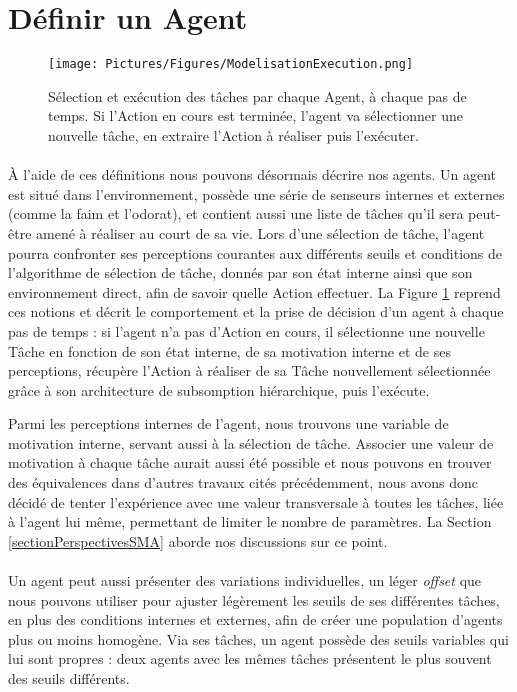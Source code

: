 	
	\section{Définir un Agent}
	
	\begin{figure}
	\centering
	\texttt{[image: Pictures/Figures/ModelisationExecution.png]}
	\caption[Sélection et exécution des tâches par chaque Agent, à chaque pas de temps.]{Sélection et exécution des tâches par chaque Agent, à chaque pas de temps. Si l'Action en cours est terminée, l'agent va sélectionner une nouvelle tâche, en extraire l'Action à réaliser puis l'exécuter.}
	\label{agentExec}
	\end{figure}		
	
		\paragraph{}
		À l'aide de ces définitions nous pouvons désormais décrire nos agents. Un agent est situé dans l'environnement, possède une série de senseurs internes et externes (comme la faim et l'odorat), et contient aussi une liste de tâches qu'il sera peut-être amené à réaliser au court de sa vie. Lors d'une sélection de tâche, l'agent pourra confronter ses perceptions courantes aux différents seuils et conditions de l'algorithme de sélection de tâche, donnés par son état interne ainsi que son environnement direct, afin de savoir quelle Action effectuer. La Figure \ref{agentExec} reprend ces notions et décrit le comportement et la prise de décision d'un agent à chaque pas de temps : si l'agent n'a pas d'Action en cours, il sélectionne une nouvelle Tâche en fonction de son état interne, de sa motivation interne et de ses perceptions, récupère l'Action à réaliser de sa Tâche nouvellement sélectionnée grâce à son architecture de subsomption hiérarchique, puis l'exécute.
		
		Parmi les perceptions internes de l'agent, nous trouvons une variable de motivation interne, servant aussi à la sélection de tâche. Associer une valeur de motivation à chaque tâche aurait aussi été possible et nous pouvons en trouver des équivalences dans d'autres travaux cités précédemment, nous avons donc décidé de tenter l'expérience avec une valeur transversale à toutes les tâches, liée à l'agent lui même, permettant de limiter le nombre de paramètres. La Section \ref{sectionPerspectivesSMA} aborde nos discussions sur ce point.
		
		\paragraph{}
		Un agent peut aussi présenter des variations individuelles, un léger \textit{offset} que nous pouvons utiliser pour ajuster légèrement les seuils de ses différentes tâches, en plus des conditions internes et externes, afin de créer une population d'agents plus ou moins homogène. Via ses tâches, un agent possède des seuils variables qui lui sont propres : deux agents avec les mêmes tâches présentent le plus souvent des seuils différents.
		
